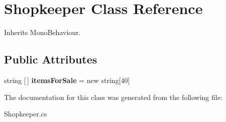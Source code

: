 \hypertarget{class_shopkeeper}{}\section{Shopkeeper Class Reference}
\label{class_shopkeeper}


Inherits Mono\+Behaviour.

\subsection*{Public Attributes}
\begin{DoxyCompactItemize}
\item 
\mbox{\label{class_shopkeeper_a02f213a25fd8a62b51c2fd637c35066d}} 
string \mbox{[}$\,$\mbox{]} {\bfseries items\+For\+Sale} = new string\mbox{[}40\mbox{]}
\end{DoxyCompactItemize}


The documentation for this class was generated from the following file\+:\begin{DoxyCompactItemize}
\item 
Shopkeeper.\+cs\end{DoxyCompactItemize}
